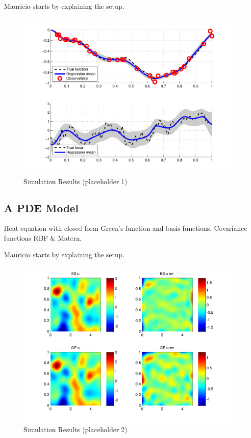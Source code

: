 \documentclass[journal]{IEEEtran}
\newcommand{\simo}[1]{{\color{red}#1}}
\begin{document}
\simo{Mauricio starts by explaining the setup.}

\begin{figure}[!t]
\centering
\includegraphics[width=\columnwidth]{placeholder1}
\caption{Simulation Results (placeholder 1)}
\label{fig_sim}
\end{figure}


\subsection{A PDE Model}
%
\simo{Heat equation with closed form Green's function and basis functions. Covariance functions RBF \& Matern.}

\simo{Mauricio starts by explaining the setup.}

\begin{figure}[!t]
\centering
\includegraphics[width=\columnwidth]{placeholder2}
\caption{Simulation Results (placeholder 2)}
\label{fig_sim}
\end{figure}
\end{document}
